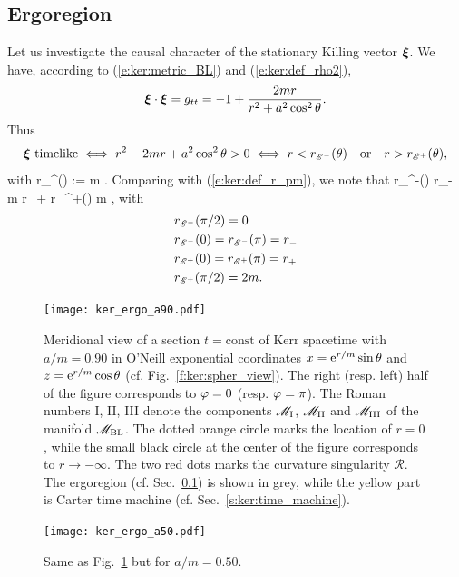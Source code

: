 \subsection{Ergoregion} \label{s:ker:ergoregion}

Let us investigate the causal character of the stationary Killing vector $\bm{\xi}$.
We have, according to (\ref{e:ker:metric_BL}) and (\ref{e:ker:def_rho2}),
\[
    \bm{\xi}\cdot\bm{\xi} = g_{tt} = - 1 + \frac{2m r}{r^2 + a^2\cos^2\theta} .
\]
Thus
\[
    \bm{\xi}\ \mbox{timelike} \iff r^2 - 2 m r + a^2\cos^2\theta > 0
        \iff r < r_{\mathscr{E}^-}(\theta) \quad\mbox{or}\quad  r > r_{\mathscr{E}^+}(\theta) ,
\]
with
\be \label{e:ker:ergosphere_radius}
    r_{\E^\pm}(\theta) := m \pm {} .
\ee
Comparing with (\ref{e:ker:def_r_pm}), we note that
 \leq r_{\E^-}(\theta) \leq r_- \leq m \leq r_+ \leq r_{\E^+}(\theta)
         m ,
\ee
with
\begin{subequations}
\begin{align}
 & r_{\mathscr{E}^-}(\pi/2) = 0 \label{e:ker:r_ergo_m_eq} \\
 & r_{\mathscr{E}^-}(0)  = r_{\mathscr{E}^-}(\pi) = r_- \\
 & r_{\mathscr{E}^+}(0)  = r_{\mathscr{E}^+}(\pi) = r_+ \\
 & r_{\mathscr{E}^+}(\pi/2) = 2 m . \label{e:ker:r_ergo_p_eq}
\end{align}
\end{subequations}

\begin{figure}
\centerline{\texttt{[image: ker\_ergo\_a90.pdf]}}
\caption[]{\label{f:ker:ergo_a90} \footnotesize
Meridional view of a section $t=\mathrm{const}$ of Kerr spacetime with $a/m=0.90$ in
O'Neill exponential coordinates $x = \mathrm{e}^{r/m}\sin\theta$ and $z = \mathrm{e}^{r/m}\cos\theta$ (cf. Fig.~\ref{f:ker:spher_view}).
The right (resp. left) half of the figure corresponds to $\varphi=0$ (resp. $\varphi=\pi$).
The Roman numbers I, II, III denote the components $\mathscr{M}_{\rm I}$, $\mathscr{M}_{\rm II}$ and
$\mathscr{M}_{\rm III}$ of the manifold $\mathscr{M}_{\rm BL}$. The dotted orange circle marks the location
of $r=0$, while the small black circle at the center of the figure corresponds to
$r\rightarrow -\infty$. The two red dots marks the curvature singularity $\mathscr{R}$.
The ergoregion (cf. Sec.~\ref{s:ker:ergoregion}) is shown in grey, while the
yellow part is Carter time machine (cf. Sec.~\ref{s:ker:time_machine}).
}
\end{figure}

\begin{figure}
\centerline{\texttt{[image: ker\_ergo\_a50.pdf]}}
\caption[]{\label{f:ker:ergo_a50} \footnotesize
Same as Fig.~\ref{f:ker:ergo_a90} but for $a/m=0.50$.
}
\end{figure}

